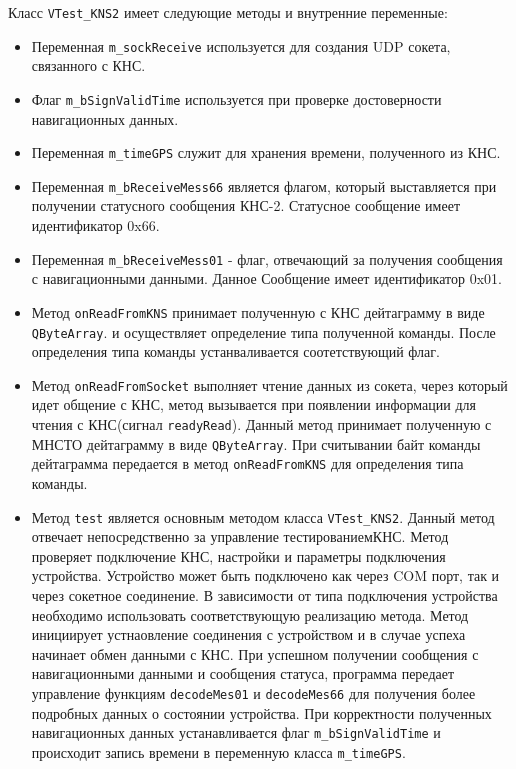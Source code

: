 Класс \texttt{VTest\_KNS2} имеет следующие методы и внутренние переменные:
\begin{itemize}
	\item Переменная \texttt{m\_sockReceive} используется для создания UDP сокета, связанного с КНС.

	\item Флаг \texttt{m\_bSignValidTime} используется при проверке достоверности навигационных данных.

	\item Переменная \texttt{m\_timeGPS} служит для хранения времени, полученного из КНС.

	\item Переменная \texttt{m\_bReceiveMess66} является флагом, который выставляется при получении статусного
		сообщения КНС-2. Статусное сообщение имеет идентификатор 0x66.

	\item Переменная \texttt{m\_bReceiveMess01} - флаг, отвечающий за получения сообщения с навигационными данными.
		Данное Сообщение имеет идентификатор 0x01.

	\item Метод \texttt{onReadFromKNS} принимает полученную с КНС дейтаграмму в виде \texttt{QByteArray}.
		и осуществляет определение типа полученной команды. После определения типа команды устанваливается
		соотетствующий флаг.

	\item Метод \texttt{onReadFromSocket} выполняет чтение данных из сокета, через который идет общение с КНС,
		метод вызывается при появлении информации для чтения с КНС(сигнал \texttt{readyRead}).
		Данный метод принимает полученную с МНСТО дейтаграмму в виде \texttt{QByteArray}.
		При считывании байт команды дейтаграмма передается в метод \texttt{onReadFromKNS} для определения типа
		команды.

	\item Метод \texttt{test} является основным методом класса \texttt{VTest\_KNS2}. Данный метод отвечает
		непосредственно за управление тестированием\break КНС. Метод проверяет подключение КНС, настройки и
		параметры подключения устройства. Устройство может быть подключено как через COM порт, так и через
		сокетное соединение. В зависимости от типа подключения устройства необходимо использовать
		соответствующую реализацию метода. Метод инициирует устнаовление соединения с устройством и в случае
		успеха начинает обмен данными с КНС. При успешном получении сообщения с навигационными данными и сообщения
		статуса, программа передает управление функциям \texttt{decodeMes01} и \texttt{decodeMes66} для
		получения более подробных данных о состоянии устройства. При корректности полученных навигационных
		данных устанавливается флаг \texttt{m\_bSignValidTime} и происходит запись времени в переменную класса
		\texttt{m\_timeGPS}.


\end{itemize}
